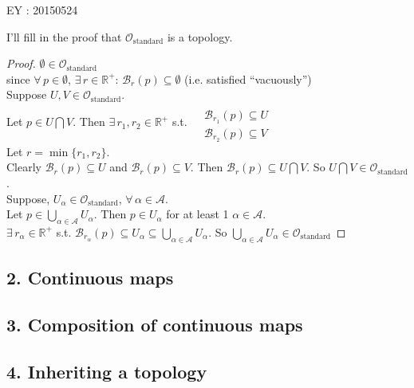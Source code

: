 \documentclass[10pt]{amsart}
\begin{document}
\begin{multicols*}{2}
EY : 20150524 

I'll fill in the proof that $\mathcal{O}_{\text{standard}}$ is a topology.  

\begin{proof}
	$\emptyset \in \mathcal{O}_{\text{standard}}$ \\
	since $\forall \, p \in \emptyset$, $\exists \, r \in \mathbb{R}^+$: $\mathcal{B}_r(p) \subseteq \emptyset$ (i.e. satisfied ``vacuously'') \\
	
	Suppose $U,V \in \mathcal{O}_{\text{standard}}$.  \\
	Let $p \in U \bigcap V$.  Then $\exists \, r_1, r_2 \in \mathbb{R}^+$ s.t. $\begin{aligned} & \quad \\
	& \mathcal{B}_{r_1}(p) \subseteq U \\
	& \mathcal{B}_{r_2}(p) \subseteq V \end{aligned}$ \\
	
	Let $r=\min{ \lbrace r_1, r_2 \rbrace}$.   \\
	Clearly $\mathcal{B}_r(p) \subseteq U$ and $\mathcal{B}_r(p) \subseteq V$.  Then $\mathcal{B}_r(p) \subseteq U \bigcap V$.  So $U\bigcap V \in \mathcal{O}_{\text{standard}}$.   \\
	
	Suppose, $U_{\alpha} \in \mathcal{O}_{\text{standard}}$, $\forall \, \alpha \in \mathcal{A}$.  \\
	Let $p \in \bigcup_{\alpha \in \mathcal{A}} U_{\alpha}$.  Then $p \in U_{\alpha}$ for at least 1 $\alpha \in \mathcal{A}$.  \\
	\phantom{ \quad \, } $\exists \, r_{\alpha} \in \mathbb{R}^+$ s.t. $\mathcal{B}_{r_{\alpha}}(p) \subseteq U_{\alpha} \subseteq \bigcup_{\alpha \in \mathcal{A}} U_{\alpha}$.  So $\bigcup_{\alpha \in \mathcal{A}} U_{\alpha} \in \mathcal{O}_{\text{standard}}$  
\end{proof}


\subsection{2. Continuous maps}

\subsection{3. Composition of continuous maps}

\subsection{4. Inheriting a topology}



\end{multicols*}
\end{document}
